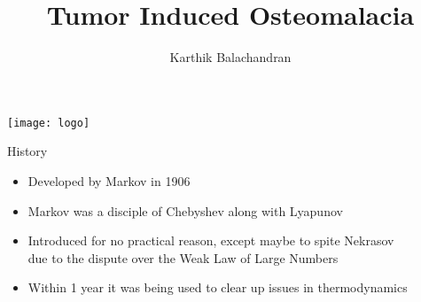 \documentclass[english]{beamer} %
\begin{document}
\title[TIO]{Tumor Induced Osteomalacia}

\author{Karthik Balachandran}
\date{}

\begin{frame}
  \titlepage
  \vspace{-30pt}
  \begin{center}
    \texttt{[image: logo]}
  \end{center}
\end{frame}

\newcommand{\Gaussian}{\rput(0,-0.35){\psset{yunit=0.8cm,xunit=0.3}
     \psGauss[linecolor=red, linewidth=0.8pt, sigma=0.5]{-1.5}{1.5}}}
\def\dedge{\ncline[linestyle=dashed]}
\def\omitnode{\Tr*[edge=\dedge]{}}

\begin{frame}[<+->]{History}
\begin{itemize}
\item Developed by Markov in 1906
\item Markov was a disciple of Chebyshev  along with Lyapunov
\item Introduced for no practical reason, except maybe to spite Nekrasov\\
due to the dispute over the Weak Law of Large Numbers
\item Within 1 year it was being used to clear up issues in thermodynamics
\end{itemize}
\end{frame}
\end{document}

